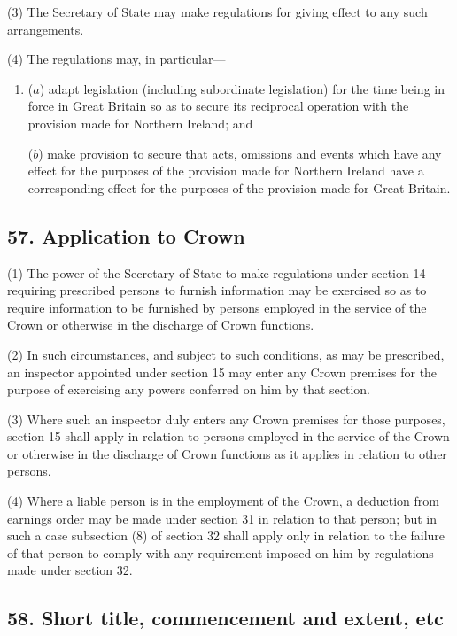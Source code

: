 \documentclass[12pt,a4paper]{article}
\begin{document}
(3) The Secretary of State may make regulations for giving effect to any such arrangements.

(4) The regulations may, in particular—
\begin{enumerate}\item[]
($a$) adapt legislation (including subordinate legislation) for the time being in force in Great Britain so as to secure its reciprocal operation with the provision made for Northern Ireland; and

($b$) make provision to secure that acts, omissions and events which have any effect for the purposes of the provision made for Northern Ireland have a corresponding effect for the purposes of the provision made for Great Britain.
\end{enumerate}


\subsection{57. Application to Crown}

(1) The power of the Secretary of State to make regulations under section 14 requiring prescribed persons to furnish information may be exercised so as to require information to be furnished by persons employed in the service of the Crown or otherwise in the discharge of Crown functions.

(2) In such circumstances, and subject to such conditions, as may be prescribed, an inspector appointed under section 15 may enter any Crown premises for the purpose of exercising any powers conferred on him by that section.

(3) Where such an inspector duly enters any Crown premises for those purposes, section 15 shall apply in relation to persons employed in the service of the Crown or otherwise in the discharge of Crown functions as it applies in relation to other persons.

(4) Where a liable person is in the employment of the Crown, a deduction from earnings order may be made under section 31 in relation to that person; but in such a case subsection (8)  of section 32 shall apply only in relation to the failure of that person to comply with any requirement imposed on him by regulations made under section 32.


\subsection{58. Short title, commencement and extent, etc}
\end{document}
